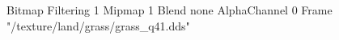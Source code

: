 {Bitmap
	{Filtering 1}
	{Mipmap 1}
	{Blend none}
	{AlphaChannel 0}
	{Frame "/texture/land/grass/grass_q41.dds"}
}
